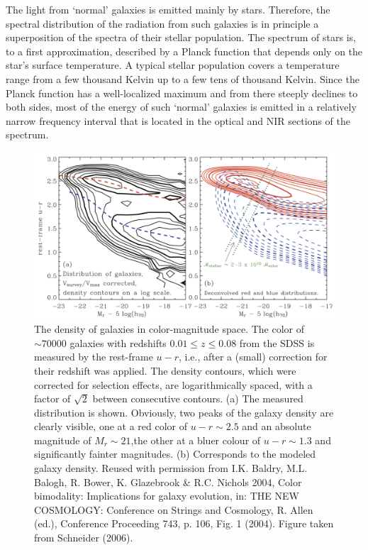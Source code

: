\documentclass[a4paper,11pt]{article}
\begin{document}
{\noindent}The light from `normal' galaxies is emitted mainly by stars. Therefore, the spectral distribution of the radiation from such galaxies is in principle a superposition of the spectra of their stellar population. The spectrum of stars is, to a first approximation, described by a Planck function that depends only on the star's surface temperature. A typical stellar population covers a temperature range from a few thousand Kelvin up to a few tens of thousand Kelvin. Since the Planck function has a well-localized maximum and from there steeply declines to both sides, most of the energy of such `normal' galaxies is emitted in a relatively narrow frequency interval that is located in the optical and NIR sections of the spectrum.

\begin{figure}[t]
    \centering
    \includegraphics[width=16cm]{figures/SDSSCMD.png}
    \caption{\footnotesize{The density of galaxies in color-magnitude space. The color of $\sim70000$ galaxies with redshifts $0.01\leq z\leq0.08$ from the SDSS is measured by the rest-frame $u-r$, i.e., after a (small) correction for their redshift was applied. The density contours, which were corrected for selection effects, are logarithmically spaced, with a factor of $\sqrt{2}$ between consecutive contours. (a) The measured distribution is shown. Obviously, two peaks of the galaxy density are clearly visible, one at a red color of $u-r\sim2.5$ and an absolute magnitude of $M_r\sim21$,the other at a bluer colour of $u-r\sim1.3$ and significantly fainter magnitudes. (b) Corresponds to the modeled galaxy density. Reused with permission from I.K. Baldry, M.L. Balogh, R. Bower, K. Glazebrook \& R.C. Nichols 2004, Color bimodality: Implications for galaxy evolution, in: THE NEW COSMOLOGY: Conference on Strings and Cosmology, R. Allen (ed.), Conference Proceeding 743, p. 106, Fig. 1 (2004). Figure taken from Schneider (2006).}}
    \label{fig:sdsscmd}
\end{figure}
\end{document}
